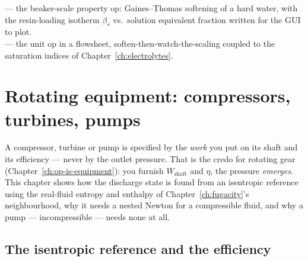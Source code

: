 \documentclass[11pt,a4paper]{article}
\begin{document}
\begin{tutoriallink}
 --- the beaker-scale
 property op: Gaines--Thomas softening of a hard water,
with the resin-loading isotherm $\beta_s$ vs.\ solution equivalent
fraction written for the GUI to plot. \\
 --- the
 unit op in a flowsheet, soften-then-watch-the-scaling
coupled to the saturation indices of Chapter~\ref{ch:electrolytes}.
\end{tutoriallink}

\section{Rotating equipment: compressors, turbines, pumps}\label{ch:rotating}

\begin{whatyoulllearn}
A compressor, turbine or pump is specified by the \emph{work} you put
on its shaft and its efficiency --- never by the outlet pressure.  That
is the credo for rotating gear (Chapter~\ref{ch:op-is-equipment}): you
furnish $W_{\text{shaft}}$ and $\eta$, the pressure \emph{emerges}.
This chapter shows how the discharge state is found from an isentropic
reference using the real-fluid entropy and enthalpy of
Chapter~\ref{ch:fugacity}'s neighbourhood, why it needs a nested
Newton for a compressible fluid, and why a pump --- incompressible ---
needs none at all.
\end{whatyoulllearn}

\subsection{The isentropic reference and the efficiency}
\end{document}
